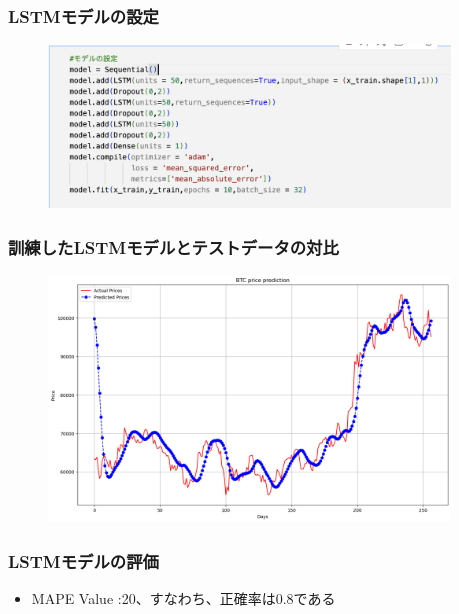\documentclass{beamer}  %
\begin{document}
\begin{frame}
    \frametitle{LSTMモデルの設定}
    \begin{figure}[h]
        \begin{center}
            \includegraphics[keepaspectratio, width=0.95\textwidth]{pic/dl1.png}\\
        \end{center}
    \end{figure}
\end{frame}

\begin{frame}
    \frametitle{訓練したLSTMモデルとテストデータの対比}
    \begin{figure}[h]
        \begin{center}
            \includegraphics[keepaspectratio, width=0.95\textwidth]{pic/dl2.png}\\
        \end{center}
    \end{figure}
\end{frame}

\begin{frame}
    \frametitle{LSTMモデルの評価}
    \begin{itemize}
        \item MAPE Value :20、すなわち、正確率は0.8である
    \end{itemize}
\end{frame}
\end{document}
